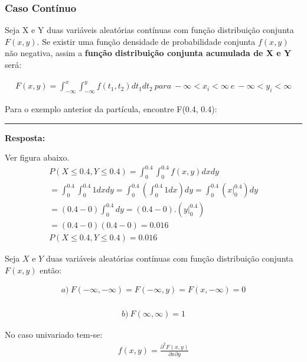 \documentclass[
  letterpaper,
  DIV=11,
  numbers=noendperiod]{scrartcl}
\begin{document}
\subsubsection{Caso Contínuo}\label{caso-contuxednuo}

Seja X e Y duas variáveis aleatórias contínuas com função distribuição
conjunta \(F(x,y)\). Se existir uma função densidade de probabilidade
conjunta \(f(x,y)\) não negativa, assim a \textbf{função distribuição
conjunta acumulada de X e Y} será:

\[\begin{array}{ccc}
 F(x,y) = \int_{-\infty}^{x}\int_{- \infty}^{y} f(t_{1},t_{2})dt_{1}dt_{2} \ para \ -\infty < x_{i} < \infty \ e \ -\infty < y_{i} < \infty 
\end{array}\]

\begin{exemplo}

Para o exemplo anterior da partícula, encontre F(0.4, 0.4):

\begin{center}\rule{0.5\linewidth}{0.5pt}\end{center}

\textbf{Resposta:}

Ver figura abaixo. \[\begin{array}{ccc}
P(X \leq 0.4 ,Y \leq 0.4)= \int_{0}^{0.4}\int_{0}^{0.4}f(x,y)dxdy
\\
=\int_{0}^{0.4}\int_{0}^{0.4}1dxdy=\int_{0}^{0.4}(\int_{0}^{0.4}1dx)dy=\int_{0}^{0.4}(x\Big|_{0}^{0.4})dy
\\
=(0.4-0)\int_{0}^{0.4}dy=(0.4-0).(y\Big|_{0}^{0.4})\\
=(0.4-0)(0.4-0)=0.016
\\
P(X  \leq 0.4,Y \leq 0.4)=0.016
\end{array}\]

\end{exemplo}

\begin{teorema}

Seja \(X\) e \(Y\) duas variáveis aleatórias contínuas com função
distribuição conjunta \(F(x,y)\) então:

\[\begin{array}{ccc}
a) \ F(- \infty, - \infty )=  F(- \infty, y )=  F(x, - \infty )=0 \\
\end{array}\]

\[\begin{array}{ccc}
b) \ F(\infty, \infty ) = 1
\end{array}\]

No caso univariado tem-se: \[\begin{array}{ccc}
 f(x,y) = \frac{\partial^{2}F(x,y) }{\partial x \partial y} 
\end{array}\]

\end{teorema}
\end{document}

